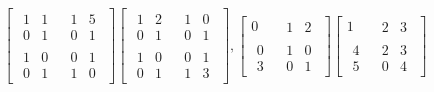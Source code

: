 \documentclass{amsbook}
\theoremstyle{definition}
\theoremstyle{remark}
\numberwithin{section}{chapter}
\numberwithin{equation}{chapter}
\begin{document}
\[
\left[
\begin{array}{c|c}
\begin{matrix}
1&1\\
0&1\end{matrix} & \begin{matrix}
1&5\\
0&1\end{matrix}\\\hline
\begin{matrix}
1&0\\
0&1\end{matrix}&\begin{matrix}
0&1\\
1&0\end{matrix}
\end{array}
\right]
\left[
\begin{array}{c|c}
\begin{matrix}
1&2\\
0&1\end{matrix} & \begin{matrix}
1&0\\
0&1\end{matrix}\\\hline
\begin{matrix}
1&0\\
0&1\end{matrix}&\begin{matrix}
0&1\\
1&3\end{matrix}
\end{array}
\right],
\left[
\begin{array}{c|c}
0&\begin{matrix}1&2\end{matrix}\\\hline
\begin{matrix}0\\3\end{matrix}&\begin{matrix}
1&0\\0&1\end{matrix}
\end{array}
\right]
\left[
\begin{array}{c|c}
1&\begin{matrix}2&3\end{matrix}\\\hline
\begin{matrix}4\\5\end{matrix}&\begin{matrix}
2&3\\0&4\end{matrix}
\end{array}
\right]
\]
\end{document}
